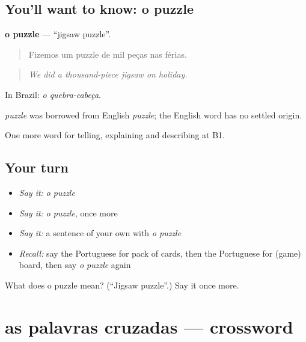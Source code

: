 \subsection*{You'll want to know: o puzzle}
\textbf{o puzzle} — \textquotedblleft{}jigsaw puzzle\textquotedblright{}.

\begin{quote}
Fizemos um puzzle de mil peças nas férias.
\end{quote}

\begin{quote}
\emph{We did a thousand-piece jigsaw on holiday.}
\end{quote}

In Brazil: \emph{o quebra-cabeça}.

\begin{cousinweb}
\emph{puzzle} was borrowed from English \emph{puzzle}; the English word has no settled origin.
\end{cousinweb}

\begin{grammarlens}[title={What you've built}]
One more word for telling, explaining and describing at B1.
\end{grammarlens}

\subsection*{Your turn}
\begin{itemize}
\raggedright
  \item \emph{Say it:} \emph{o puzzle}
  \item \emph{Say it:} \emph{o puzzle}, once more
  \item \emph{Say it:} a sentence of your own with \emph{o puzzle}
  \item \emph{Recall:} say the Portuguese for pack of cards, then the Portuguese for (game) board, then say \emph{o puzzle} again
\end{itemize}

\begin{tcolorbox}[breakable,colback=teal!4,colframe=teal!35!black,title={Before you move on}]
What does o puzzle mean? (\textquotedblleft{}Jigsaw puzzle\textquotedblright{}.) Say it once more.
\end{tcolorbox}
\section[as palavras cruzadas]{as palavras cruzadas — crossword}


